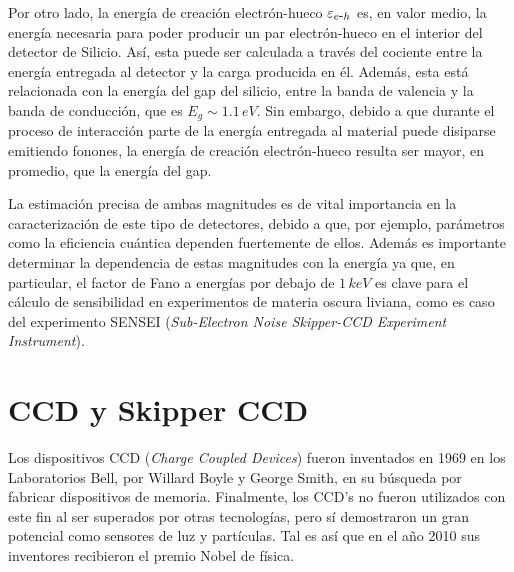 Por otro lado, la energía de creación electrón-hueco $\varepsilon_{e\mbox{-}h}$ es, en valor medio, la energía necesaria para poder producir un par electrón-hueco en el interior del detector de Silicio. Así, esta puede ser calculada a través del cociente entre la energía entregada al detector y la carga producida en él. Además, esta está relacionada con la energía del gap del silicio, entre la banda de valencia y la banda de conducción, que es $E_{g}\sim 1.1\,\si{eV}$\cite{Janesick}. Sin embargo, debido a que durante el proceso de interacción parte de la energía entregada al material puede disiparse emitiendo fonones, la energía de creación electrón-hueco resulta ser mayor, en promedio, que la energía del gap.

La estimación precisa de ambas magnitudes es de vital importancia en la caracterización de este tipo de detectores, debido a que, por ejemplo, parámetros como la eficiencia cuántica dependen fuertemente de ellos. Además es importante determinar la dependencia de estas magnitudes con la energía ya que, en particular, el factor de Fano a energías por debajo de $1\,\si{keV}$ es clave para el cálculo de sensibilidad en experimentos de materia oscura liviana, como es caso del experimento SENSEI (\textit{Sub-Electron Noise Skipper-CCD Experiment Instrument})\cite{barak}.
\section{CCD y Skipper CCD}
\noindent Los dispositivos CCD (\textit{Charge Coupled Devices}) fueron inventados en 1969 en los Laboratorios Bell, por Willard Boyle y George Smith, en su búsqueda por fabricar dispositivos de memoria. Finalmente, los CCD's no fueron utilizados con este fin al ser superados por otras tecnologías, pero sí demostraron un gran potencial como sensores de luz y partículas. Tal es así que en el año 2010 sus inventores recibieron el premio Nobel de física\cite{Boyle, Smith}.

